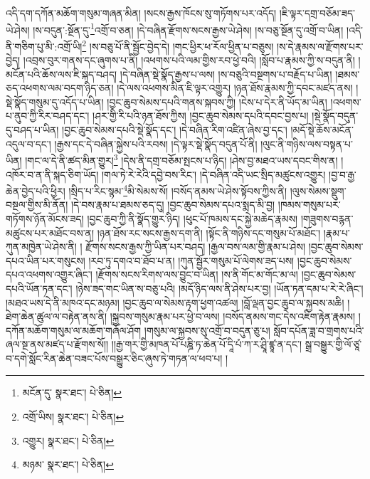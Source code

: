 འདི་དག་དཀོན་མཆོག་གསུམ་གཞན་མིན། །སངས་རྒྱས་ཁོངས་སུ་གཏོགས་པར་འདོད། །ཇི་ལྟར་དགྲ་བཅོམ་ཟད་ཡེ་ཤེས། །ས་བདུན་:སྔོན་དུ་\footnote{མངོན་དུ་  སྣར་ཐང་།  པེ་ཅིན། }འགྲོ་བ་ཅན། །དེ་བཞིན་རྫོགས་སངས་རྒྱས་ཡེ་ཤེས། །ས་བཅུ་སྔོན་དུ་འགྲོ་བ་ཡིན། །འདི་ནི་གཅིག་པུ་མི་:འགྲོ་ཡི།\footnote{འགྲོ་ཡིས།  སྣར་ཐང་།  པེ་ཅིན། } །ས་བཅུ་པོ་ནི་སྦྱོང་བྱེད་དེ། །གང་ཕྱིར་ཕ་རོལ་ཕྱིན་པ་བཅུས། །ས་དེ་རྣམས་ལ་རྫོགས་པར་བྱེད། །འབྲས་བུར་གནས་དང་ཞུགས་པ་ནི། །འཕགས་པའི་ལམ་གྱིས་རབ་ཕྱེ་བའི། །སློབ་པ་རྣམས་ཀྱི་ས་བདུན་ནི། །མངོན་པའི་ཆོས་ལས་ཇི་སྐད་བཤད། །དེ་བཞིན་སྡེ་སྣོད་རྒྱས་པ་ལས། །ས་བཅུའི་བསྔགས་པ་བརྗོད་པ་ཡིན། །ཐམས་ཅད་འཕགས་ལམ་བདག་ཉིད་ཅན། །དེ་ལས་འཕགས་མིན་ཇི་ལྟར་འགྱུར། །ཉན་ཐོས་རྣམས་ཀྱི་དབང་མཛད་ནས། །སྡེ་སྣོད་གསུམ་དུ་འདོད་པ་ཡིན། །བྱང་ཆུབ་སེམས་དཔའི་གནས་སྐབས་ཀྱི། །ངེས་པ་དེར་ནི་ཡོད་མ་ཡིན། །འཕགས་པ་ནུབ་ཀྱི་རིར་བཤད་དང་། །ཤར་གྱི་རི་པའི་ཉན་ཐོས་ཀྱིས། །བྱང་ཆུབ་སེམས་དཔའི་དབང་བྱས་པ། །སྡེ་སྣོད་བདུན་དུ་བཤད་པ་ཡིན། །བྱང་ཆུབ་སེམས་དཔའི་སྡེ་སྣོད་དང་། །དེ་བཞིན་རིག་འཛིན་ཞེས་བྱ་དང་། །མདོ་སྡེ་ཆོས་མངོན་འདུལ་བ་དང་། །རྒྱས་དང་དེ་བཞིན་སྐྱེས་པའི་རབས། །དེ་ལྟར་སྡེ་སྣོད་བདུན་པོ་ནི། །ལུང་ནི་གཉིས་ལས་བསྟན་པ་ཡིན། །གང་ལ་དེ་ནི་ཚད་མིན་གྱུར།\footnote{འགྱུར།  སྣར་ཐང་།  པེ་ཅིན། } །དེས་ནི་དགྲ་བཅོམ་སྤངས་པ་ཉིད། །ཤེས་བྱ་མཐའ་ཡས་དབང་གིས་ན། །འཁོར་བ་ན་ནི་སྐད་ཅིག་ཡོད། །གལ་ཏེ་རེ་རེའི་དབྱེ་བས་རིང་། །དེ་བཞིན་འདི་ཡང་སྲིད་མཚུངས་འགྱུར། །བྱ་བ་རྒྱ་ཆེན་བྱེད་པའི་ཕྱིར། །སྲིད་པ་རིང་སྙམ་\footnote{མཉམ་  སྣར་ཐང་།  པེ་ཅིན། }མི་སེམས་སོ། །བསོད་ནམས་ཡེ་ཤེས་སྟོབས་ཀྱིས་ནི། །ལུས་སེམས་སྡུག་བསྔལ་གྱིས་མི་ནོན། །དེ་བས་རྣམ་པ་ཐམས་ཅད་དུ། །བྱང་ཆུབ་སེམས་དཔའ་སྨད་མི་བྱ། །ཁམས་གསུམ་པར་གཏོགས་ཉོན་མོངས་ཟད། །བྱང་ཆུབ་ཀྱི་ནི་སྣོད་གྱུར་ཉིད། །ཕུང་པོ་ཁམས་དང་སྐྱེ་མཆེད་རྣམས། །གཟུགས་བརྙན་མཚུངས་པར་མཐོང་བས་ན། །ཉན་ཐོས་རང་སངས་རྒྱས་དག་ནི། །སྟོང་ནི་གཉིས་དང་གསུམ་པོ་མཐོང་། །རྣམ་པ་ཀུན་མཁྱེན་ཡེ་ཤེས་ནི། །
རྫོགས་སངས་རྒྱས་ཀྱི་ཡིན་པར་བཤད། །རྒྱལ་བས་ལམ་གྱི་རྣམ་པ་ཤེས། །བྱང་ཆུབ་སེམས་དཔའ་ཡིན་པར་གསུངས། །རབ་ཏུ་དགའ་བ་ཐོབ་པ་ན། །ཀུན་སྦྱོར་གསུམ་པོ་ལེགས་ཟད་པས། །བྱང་ཆུབ་སེམས་དཔའ་འཕགས་འགྱུར་ཞིང་། །རྫོགས་སངས་རིགས་ལས་བྱུང་བ་ཡིན། །ས་ནི་གོང་མ་གོང་མ་ལ། །བྱང་ཆུབ་སེམས་དཔའི་ཡོན་ཏན་དང་། །ཉེས་ཟད་གང་ཡིན་ས་བཅུ་པའི། །མདོ་ཉིད་ལས་ནི་ཤེས་པར་བྱ། །ཡོན་ཏན་དམ་པ་རེ་རེ་ཞིང་། །མཐའ་ཡས་དེ་ནི་མཁའ་དང་མཉམ། །བྱང་ཆུབ་ལ་སེམས་རྟག་ཕྱག་འཚལ། །བློ་ལྡན་བྱང་ཆུབ་ལ་སྐྱབས་མཆི། །ཐེག་ཆེན་ཚུལ་ལ་བརྟེན་ནས་ནི། །སྐྱབས་གསུམ་རྣམ་པར་ཕྱེ་བ་ལས། །བསོད་ནམས་གང་དེས་འཇིག་རྟེན་རྣམས། །དཀོན་མཆོག་གསུམ་ལ་མཆོག་གཞོལ་ཤོག །གསུམ་ལ་སྐྱབས་སུ་འགྲོ་བ་བདུན་ཅུ་པ། སློབ་དཔོན་ཟླ་བ་གྲགས་པའི་ཞལ་སྔ་ནས་མཛད་པ་རྫོགས་སོ།། །།རྒྱ་གར་གྱི་མཁན་པོ་པཎྜི་ཏ་ཆེན་པོ་དཱི་པཾ་ཀ་ར་ཤྲཱི་ཛྙཱ་ན་དང་། སྒྲ་བསྒྱུར་གྱི་ལོ་ཙཱ་བ་དགེ་སློང་རིན་ཆེན་བཟང་པོས་བསྒྱུར་ཅིང་ཞུས་ཏེ་གཏན་ལ་ཕབ་པ། ། 